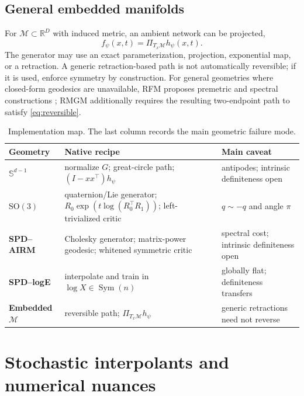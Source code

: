 \documentclass[10pt,twocolumn]{article}
\newcommand{\M}{\mathcal{M}}
\newcommand{\R}{\mathbb{R}}
\newcommand{\Sym}{\operatorname{Sym}}
\begin{document}
\subsection{General embedded manifolds}

For $\M\subset\R^D$ with induced metric, an ambient network can be projected,
\begin{equation}
 f_\psi(x,t)=\Pi_{T_x\M}h_\psi(x,t).
\end{equation}
The generator may use an exact parameterization, projection, exponential map, or a retraction. A generic retraction-based path is not automatically reversible; if it is used, enforce symmetry by construction. For general geometries where closed-form geodesics are unavailable, RFM proposes premetric and spectral constructions \citep{chen2024general}; RMGM additionally requires the resulting two-endpoint path to satisfy \cref{eq:reversible}.

\begin{table}[H]
\centering
\caption{Implementation map. The last column records the main geometric failure mode.}
\label{tab:recipes}
\scriptsize
\setlength{\tabcolsep}{3.2pt}
\renewcommand{\arraystretch}{1.16}
\begin{tabularx}{\columnwidth}{@{}>{\bfseries}p{1.22cm}p{3.18cm}X@{}}
\toprule
Geometry & Native recipe & Main caveat \\
\midrule
$\mathbb S^{d-1}$ & normalize $G$; great-circle path; $(I-xx^\top)h_\psi$ & antipodes; intrinsic definiteness open \\
$\mathrm{SO}(3)$ & quaternion/Lie generator; $R_0\exp(t\log(R_0^\top R_1))$; left-trivialized critic & $q\sim-q$ and angle $\pi$ \\
SPD--AIRM & Cholesky generator; matrix-power geodesic; whitened symmetric critic & spectral cost; intrinsic definiteness open \\
SPD--logE & interpolate and train in $\log X\in\Sym(n)$ & globally flat; definiteness transfers \\
Embedded $\M$ & reversible path; $\Pi_{T_x\M}h_\psi$ & generic retractions need not reverse \\
\bottomrule
\end{tabularx}
\end{table}

\section{Stochastic interpolants and numerical nuances}
\end{document}
